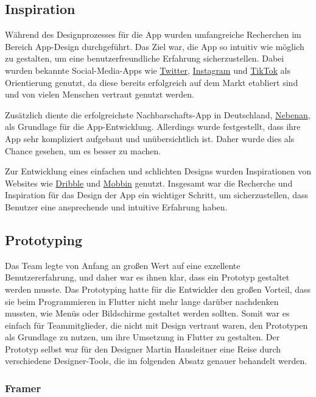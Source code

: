 \subsection{Inspiration}
Während des Designprozesses für die App wurden umfangreiche Recherchen im Bereich App-Design durchgeführt. Das Ziel war, die App so intuitiv wie möglich zu gestalten, um eine benutzerfreundliche Erfahrung sicherzustellen. Dabei wurden bekannte Social-Media-Apps wie \href{https://twitter.com/}{Twitter}, \href{https://www.instagram.com/}{Instagram} und \href{https://www.tiktok.com/}{TikTok} als Orientierung genutzt, da diese bereits erfolgreich auf dem Markt etabliert sind und von vielen Menschen vertraut genutzt werden.

Zusätzlich diente die erfolgreichste Nachbarschafts-App in Deutschland, \href{https://nebenan.de/}{Nebenan}, als Grundlage für die App-Entwicklung. Allerdings wurde festgestellt, dass ihre App sehr kompliziert aufgebaut und unübersichtlich ist. Daher wurde dies als Chance gesehen, um es besser zu machen.

Zur Entwicklung eines einfachen und schlichten Designs wurden Inspirationen von Websites wie \href{https://dribbble.com/}{Dribble} und \href{https://mobbin.design/}{Mobbin} genutzt. Insgesamt war die Recherche und Inspiration für das Design der App ein wichtiger Schritt, um sicherzustellen, dass Benutzer eine ansprechende und intuitive Erfahrung haben.

\subsection{Prototyping}
Das Team legte von Anfang an großen Wert auf eine exzellente
Benutzererfahrung, und daher war es ihnen klar, dass ein
Prototyp gestaltet werden musste. Das Prototyping hatte für
die Entwickler den großen Vorteil, dass sie beim
Programmieren in Flutter nicht mehr lange darüber nachdenken
mussten, wie Menüs oder Bildschirme gestaltet werden
sollten. Somit war es einfach für Teammitglieder, die nicht
mit Design vertraut waren, den Prototypen als Grundlage zu
nutzen, um ihre Umsetzung in Flutter zu gestalten. Der
Prototyp selbst war für den Designer Martin Hausleitner eine
Reise durch verschiedene Designer-Tools, die im folgenden
Absatz genauer behandelt werden.


\subsubsection{Framer}

